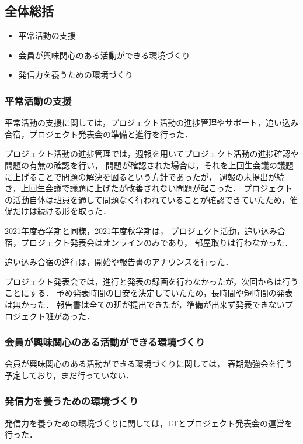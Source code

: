 \subsection*{全体総括}


\begin{itemize}
  \item 平常活動の支援
  \item 会員が興味関心のある活動ができる環境づくり
  \item 発信力を養うための環境づくり
\end{itemize}

\subsubsection*{平常活動の支援}
平常活動の支援に関しては，プロジェクト活動の進捗管理やサポート，追い込み合宿，プロジェクト発表会の準備と進行を行った．

プロジェクト活動の進捗管理では，週報を用いてプロジェクト活動の進捗確認や問題の有無の確認を行い，
問題が確認された場合は，それを上回生会議の議題に上げることで問題の解決を図るという方針であったが，
週報の未提出が続き，上回生会議で議題に上げたが改善されない問題が起こった．
プロジェクトの活動自体は班員を通して問題なく行われていることが確認できていたため，催促だけは続ける形を取った．

2021年度春学期と同様，2021年度秋学期は，
プロジェクト活動，追い込み合宿，プロジェクト発表会はオンラインのみであり，
部屋取りは行わなかった．

追い込み合宿の進行は，開始や報告書のアナウンスを行った．

プロジェクト発表会では，進行と発表の録画を行わなかったが，次回からは行うことにする．
予め発表時間の目安を決定していたため，長時間や短時間の発表は無かった．
報告書は全ての班が提出できたが，準備が出来ず発表できないプロジェクト班があった．

\subsubsection*{会員が興味関心のある活動ができる環境づくり}
会員が興味関心のある活動ができる環境づくりに関しては，
春期勉強会を行う予定しており，まだ行っていない．

\subsubsection*{発信力を養うための環境づくり}
発信力を養うための環境づくりに関しては，LTとプロジェクト発表会の運営を行った．

